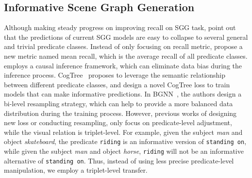 \documentclass[runningheads]{llncs}
\begin{document}
\subsection{Informative Scene Graph Generation}
Although making steady progress on improving recall on SGG task, \cite{tang2019learning,chen2019knowledge} point out that the predictions of current SGG models are easy to collapse to several general and trivial predicate classes.
Instead of only focusing on recall metric, \cite{tang2019learning,chen2019knowledge} propose a new metric named mean recall, which is the average recall of all predicate classes.
\cite{tang2020unbiased} employs a causal inference framework, which can eliminate data bias during the inference process.
CogTree~\cite{yu2020cogtree} proposes to leverage the semantic relationship between different predicate classes, and design a novel CogTree loss to train models that can make informative predictions.
In BGNN~\cite{li2021bipartite}, the authors design a bi-level resampling strategy, which can help to provide a more balanced data distribution during the training process. 
However, previous works of designing new loss or conducting resampling, only focus on predicate-level adjustment, while the visual relation is triplet-level.
For example, given the subject \textit{man} and object \textit{skateboard}, the predicate \texttt{riding} is an informative version of \texttt{standing on}, while given the subject \textit{man} and object \textit{horse}, \texttt{riding} will not be an informative alternative of \texttt{standing on}.
Thus, instead of using less precise predicate-level manipulation, we employ a triplet-level transfer. 
\end{document}
